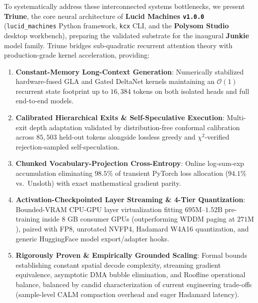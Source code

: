 \documentclass[10pt,twocolumn,letterpaper]{article}
\begin{document}
To systematically address these interconnected systems bottlenecks, we present \textbf{Triune}, the core neural architecture of \textbf{Lucid Machines \texttt{v1.0.0}} (\texttt{lucid\_machines} Python framework, \texttt{kcx} CLI, and the \textbf{Polysom Studio} desktop workbench), preparing the validated substrate for the inaugural \textbf{Junkie} model family. Triune bridges sub-quadratic recurrent attention theory with production-grade kernel acceleration, providing:
\begin{enumerate}
    \item \textbf{Constant-Memory Long-Context Generation}: Numerically stabilized hardware-fused GLA and Gated DeltaNet kernels maintaining an $\mathcal{O}(1)$ recurrent state footprint up to $16,384$ tokens on both isolated heads and full end-to-end models.
    \item \textbf{Calibrated Hierarchical Exits \& Self-Speculative Execution}: Multi-exit depth adaptation validated by distribution-free conformal calibration across $85,503$ held-out tokens alongside lossless greedy and $\chi^2$-verified rejection-sampled self-speculation.
    \item \textbf{Chunked Vocabulary-Projection Cross-Entropy}: Online log-sum-exp accumulation eliminating $98.5\%$ of transient PyTorch loss allocation ($94.1\%$ vs.\ Unsloth) with exact mathematical gradient parity.
    \item \textbf{Activation-Checkpointed Layer Streaming \& 4-Tier Quantization}: Bounded-VRAM CPU-GPU layer virtualization fitting $695\text{M}$--$1.52\text{B}$ pre-training inside $8\text{ GB}$ consumer GPUs (outperforming WDDM paging at $271\text{M}$), paired with FP8, unrotated NVFP4, Hadamard W4A16 quantization, and generic HuggingFace model export/adapter hooks.
    \item \textbf{Rigorously Proven \& Empirically Grounded Scaling}: Formal bounds establishing constant spatial decode complexity, streaming gradient equivalence, asymptotic DMA bubble elimination, and Roofline operational balance, balanced by candid characterization of current engineering trade-offs (sample-level CALM compaction overhead and eager Hadamard latency).
\end{enumerate}
\end{document}
